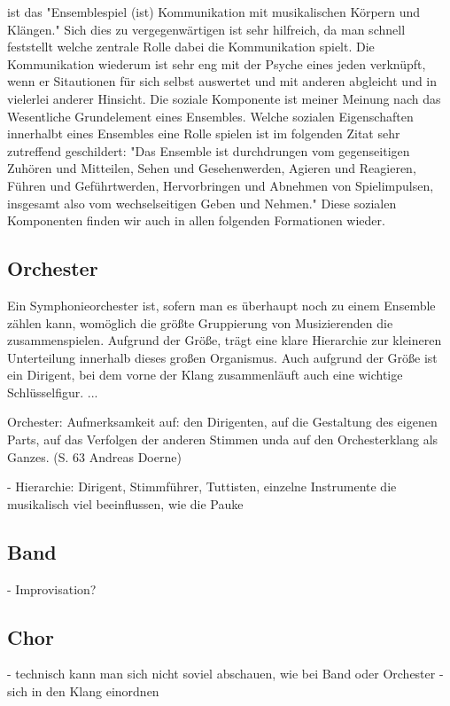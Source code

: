 ist das "Ensemblespiel (ist) Kommunikation
mit musikalischen Körpern und Klängen." \autocite[62]{doerne:umfassend_musizieren}
Sich dies zu vergegenwärtigen ist sehr hilfreich, da man schnell feststellt
welche zentrale Rolle dabei die Kommunikation spielt. Die Kommunikation wiederum
ist sehr eng mit der Psyche eines jeden verknüpft, wenn er Sitautionen für sich
selbst auswertet und mit anderen abgleicht und in vielerlei anderer Hinsicht.
Die soziale Komponente ist meiner Meinung nach das Wesentliche Grundelement
eines Ensembles. Welche sozialen Eigenschaften innerhalbt eines Ensembles eine
Rolle spielen ist im folgenden Zitat sehr zutreffend geschildert:
"Das Ensemble ist durchdrungen vom gegenseitigen Zuhören und Mitteilen, Sehen
und Gesehenwerden, Agieren und Reagieren, Führen und Geführtwerden, Hervorbringen
und Abnehmen von Spielimpulsen, insgesamt also vom wechselseitigen Geben und
Nehmen." \autocite[62]{doerne:umfassend_musizieren} Diese sozialen Komponenten
finden wir auch in allen folgenden Formationen wieder. 


\subsection{Orchester} 

Ein Symphonieorchester ist, sofern man es überhaupt noch zu einem Ensemble
zählen kann, womöglich die größte Gruppierung von Musizierenden die
zusammenspielen. Aufgrund der Größe, trägt eine klare Hierarchie zur kleineren
Unterteilung innerhalb dieses großen Organismus. Auch aufgrund der Größe ist ein
Dirigent, bei dem vorne der Klang zusammenläuft auch eine wichtige
Schlüsselfigur. ...

Orchester:
Aufmerksamkeit auf: den Dirigenten, auf die Gestaltung des eigenen Parts, auf
das Verfolgen der anderen Stimmen unda auf den Orchesterklang als Ganzes. (S. 63
Andreas Doerne)

- Hierarchie: Dirigent, Stimmführer, Tuttisten, einzelne Instrumente die
musikalisch viel beeinflussen, wie die Pauke


\subsection{Band}
- Improvisation?


\subsection{Chor}
- technisch kann man sich nicht soviel abschauen, wie bei Band oder Orchester
- sich in den Klang einordnen


